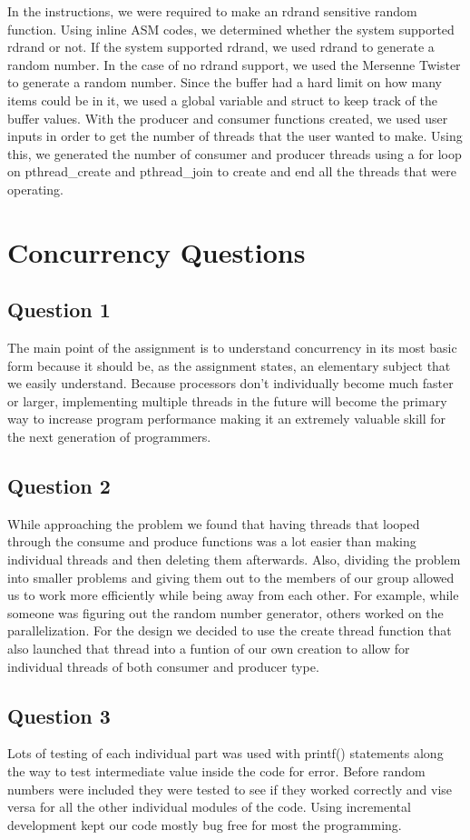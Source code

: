 \documentclass[letterpaper,10pt]{article}
\begin{document}
        In the instructions, we were required to make an rdrand sensitive random function. Using inline ASM codes, we determined whether the system supported rdrand or not. If the system supported rdrand, we used rdrand to generate a random number. In the case of no rdrand support, we used the Mersenne Twister to generate a random number. Since the buffer had a hard limit on how many items could be in it, we used a global variable and struct to keep track of the buffer values. With the producer and consumer functions created, we used user inputs in order to get the number of threads that the user wanted to make. Using this, we generated the number of consumer and producer threads using a for loop on pthread\_create and pthread\_join to create and end all the threads that were operating. 

\section{Concurrency Questions}
\subsection{Question 1}
    The main point of the assignment is to understand concurrency in its most basic form because it should be, as the assignment states, an elementary subject that we easily understand. Because processors don't individually become much faster or larger, implementing multiple threads in the future will become the primary way to increase program performance making it an extremely valuable skill for the next generation of programmers.

\subsection{Question 2}
    While approaching the problem we found that having threads that looped through the consume and produce functions was a lot easier than making individual threads and then deleting them afterwards. Also, dividing the problem into smaller problems and giving them out to the members of our group allowed us to work more efficiently while being away from each other. For example, while someone was figuring out the random number generator, others worked on the parallelization. For the design we decided to use the create thread function that also launched that thread into a funtion of our own creation to allow for individual threads of both consumer and producer type.

\subsection{Question 3}
    Lots of testing of each individual part was used with printf() statements along the way to test intermediate value inside the code for error. Before random numbers were included they were tested to see if they worked correctly and vise versa for all the other individual modules of the code. Using incremental development kept our code mostly bug free for most the programming.
\end{document}
